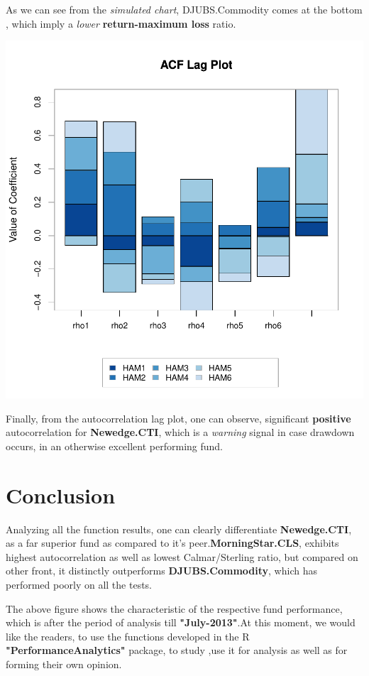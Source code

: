 \documentclass[12pt,letterpaper,english]{article}
\begin{document}
As we can see from the \emph{simulated chart}, DJUBS.Commodity comes at the bottom , which imply a \emph{lower} \textbf{return-maximum loss} ratio.

\includegraphics{Managers-010}

Finally, from the autocorrelation lag plot, one can observe, significant \textbf{positive} autocorrelation for \textbf{Newedge.CTI}, which is a \emph{warning} signal in case drawdown occurs, in an otherwise excellent performing fund.
\section{Conclusion}

Analyzing all the function results, one can clearly differentiate \textbf{Newedge.CTI}, as a far superior fund as compared to it's peer.\textbf{MorningStar.CLS}, exhibits highest autocorrelation as well as lowest Calmar/Sterling ratio, but compared on other front, it distinctly outperforms \textbf{DJUBS.Commodity}, which has performed poorly on all the tests. 

The above figure shows the characteristic of the respective fund performance, which is after the period of analysis till \textbf{"July-2013"}.At this moment, we would like the readers, to use the functions developed in the R \textbf{"PerformanceAnalytics"} package, to study ,use it for analysis as well as for forming their own opinion. 
\end{document}
